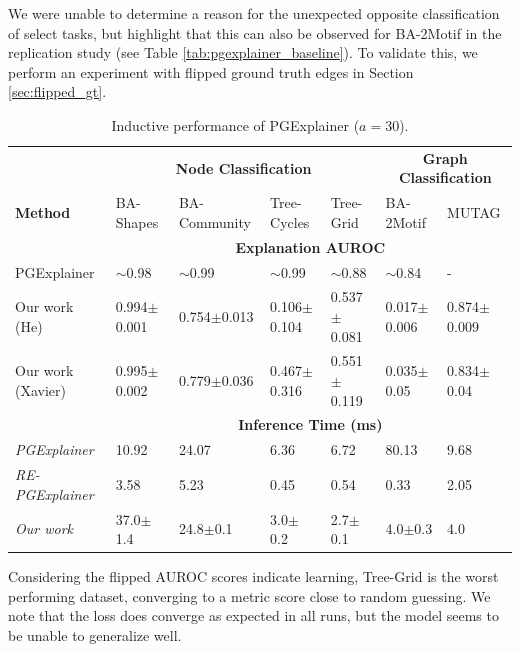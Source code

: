We were unable to determine a reason for the unexpected opposite classification of select tasks, but highlight that this can also be observed for BA-2Motif in the replication study \cite{holdijk2021re} (see Table \ref{tab:pgexplainer_baseline}). To validate this, we perform an experiment with flipped ground truth edges in Section \ref{sec:flipped_gt}. \bigskip

\begin{table}[ht]
    \centering
    \scriptsize
    \begin{tabularx}{\textwidth}{l|XXXX|XX}   %
    \textbf{} & \multicolumn{4}{c}{\textbf{Node Classification}} & \multicolumn{2}{c}{\textbf{Graph Classification}} \\
    \textbf{Method} & BA-Shapes & BA-Community & Tree-Cycles & Tree-Grid & BA-2Motif & MUTAG \\
    \midrule
    \addlinespace
    \textbf{} & \multicolumn{6}{c}{\textbf{Explanation AUROC}} \\
    \midrule
    PGExplainer & $\sim$0.98 & $\sim$0.99 & $\sim$0.99 & $\sim$0.88 & $\sim$0.84 & - \\
    \midrule
    Our work (He) & 0.994$\pm$0.001 & 0.754$\pm$0.013 & 0.106$\pm$0.104 & 0.537$\pm$0.081 & 0.017$\pm$0.006 & 0.874$\pm$0.009 \\
    \midrule
    Our work (Xavier) & 0.995$\pm$0.002 & 0.779$\pm$0.036 & 0.467$\pm$0.316 & 0.551$\pm$0.119 & 0.035$\pm$0.05 & 0.834$\pm$0.04 \\
    \midrule
    \addlinespace
    \textbf{} & \multicolumn{6}{c}{\textbf{Inference Time (ms)}} \\
    \midrule
    \textit{PGExplainer} & 10.92 & 24.07 & 6.36 & 6.72 & 80.13 & 9.68 \\
    \textit{RE-PGExplainer} & 3.58 & 5.23 & 0.45 & 0.54 & 0.33 & 2.05 \\
    \textit{Our work} & 37.0$\pm$1.4 & 24.8$\pm$0.1 & 3.0$\pm$0.2 & 2.7$\pm$0.1 & 4.0$\pm$0.3 & 4.0 \\
    \bottomrule
    \end{tabularx}
    \caption[Inductive performance of our reimplementation]{Inductive performance of PGExplainer ($a=30$).}
    \label{tab:pgexplainer_auc}
\end{table}

Considering the flipped AUROC scores indicate learning, Tree-Grid is the worst performing dataset, converging to a metric score close to random guessing. We note that the loss does converge as expected in all runs, but the model seems to be unable to generalize well.

